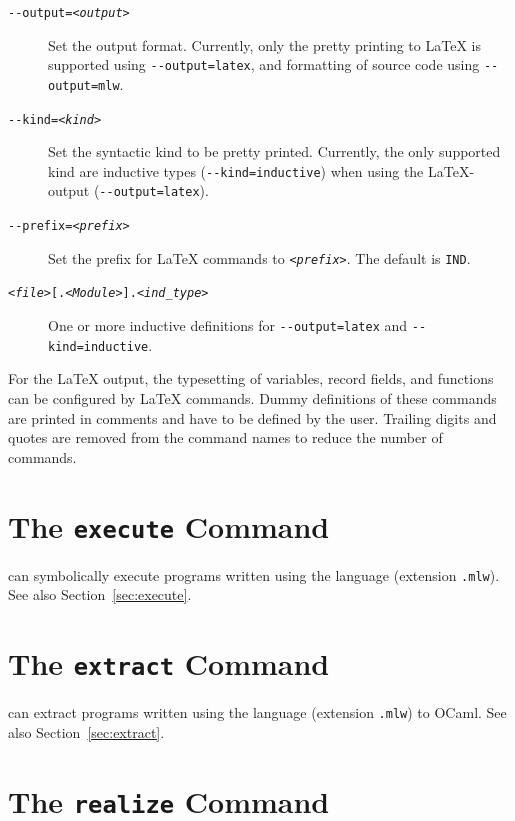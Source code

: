 \begin{description}
\item[\texttt{-{}-output=\textsl{<output>}}] Set the output format.
  Currently, only the pretty printing to \LaTeX{} is supported using
  \texttt{-{}-output=latex}, and formatting of \whyml source code using
  \texttt{-{}-output=mlw}.
\item[\texttt{-{}-kind=\textsl{<kind>}}] Set the syntactic kind to be
  pretty printed. Currently, the only supported kind are inductive types
  (\texttt{-{}-kind=inductive}) when using the \LaTeX-output
  (\texttt{-{}-output=latex}).
\item[\texttt{-{}-prefix=\textsl{<prefix>}}] Set the prefix for \LaTeX{}
  commands to \texttt{\textsl{<prefix>}}. The default is \texttt{IND}.
\item[\texttt{\textsl{<file>}[.\textsl{<Module>}].\textsl{<ind\_type>}}] One or
  more inductive definitions for \texttt{-{}-output=latex} and
  \texttt{-{}-kind=inductive}.
\end{description}

For the \LaTeX{} output, the typesetting of variables, record fields,
and functions can be configured by \LaTeX{} commands. Dummy definitions
of these commands are printed in comments and have to be defined by the
user. Trailing digits and quotes are removed from the command names to
reduce the number of commands.

\section{The \texttt{execute} Command}
\label{sec:why3execute}

\why can symbolically execute programs written using the \whyml language
(extension \texttt{.mlw}). See also Section~\ref{sec:execute}.

\section{The \texttt{extract} Command}
\label{sec:why3extract}

\why can extract programs written using the \whyml language
(extension \texttt{.mlw}) to OCaml. See also Section~\ref{sec:extract}.

\section{The \texttt{realize} Command}
\label{sec:why3realize}


